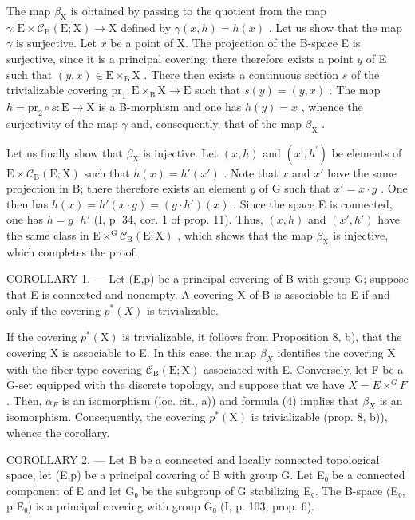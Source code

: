 The map \(\beta_{\mathrm{X}}\) is obtained by passing to the quotient from the map \(\gamma\colon\mathrm{E}\times\mathcal{C}_{\mathrm{B}}(\mathrm{E};\mathrm{X})\to\mathrm{X}\) defined by \(\gamma(x,h)=h(x)\) . Let us show that the map \(\gamma\) is surjective. Let \(x\) be a point of X. The projection of the B-space E is surjective, since it is a principal covering; there therefore exists a point \(y\) of E such that \((y,x)\in\mathrm{E}\times_{\mathrm{B}}\mathrm{X}\) . There then exists a continuous section \(s\) of the trivializable covering \(\mathrm{pr}_{1}:\mathrm{E}\times_{\mathrm{B}}\mathrm{X}\to\mathrm{E}\) such that \(s(y)=(y,x)\) . The map \(h=\mathrm{pr}_{2}\circ s:\mathrm{E}\to\mathrm{X}\) is a B-morphism and one has \(h(y)=x\) , whence the surjectivity of the map \(\gamma\) and, consequently, that of the map \(\beta_{\mathrm{X}}\) .

Let us finally show that \(\beta_{\mathrm{X}}\) is injective. Let \((x,h)\) and \((x^{\prime},h^{\prime})\) be elements of \(\mathrm{E}\times \mathcal{C}_{\mathrm{B}}(\mathrm{E};\mathrm{X})\) such that \(h(x) = h'(x')\) . Note that \(x\) and \(x'\) have the same projection in B; there therefore exists an element \(g\) of G such that \(x' = x\cdot g\) . One then has \(h(x) = h'(x\cdot g) = (g\cdot h')(x)\) . Since the space E is connected, one has \(h = g\cdot h'\) (I, p. 34, cor. 1 of prop. 11). Thus, \((x,h)\) and \((x',h')\) have the same class in \(\mathrm{E}\times^{\mathrm{G}}\mathcal{C}_{\mathrm{B}}(\mathrm{E};\mathrm{X})\) , which shows that the map \(\beta_{\mathrm{X}}\) is injective, which completes the proof.

COROLLARY 1. --- Let (E,p) be a principal covering of B with group G; suppose that E is connected and nonempty. A covering X of B is associable to E if and only if the covering \(p^{*}(X)\) is trivializable.

If the covering \(p^{*}(\mathrm{X})\) is trivializable, it follows from Proposition 8, b), that the covering X is associable to E. In this case, the map \(\beta_{X}\) identifies the covering X with the fiber-type covering \(\mathcal{C}_{\mathrm{B}}(\mathrm{E};\mathrm{X})\) associated with E. Conversely, let F be a G-set equipped with the discrete topology, and suppose that we have \(X = E \times^{G} F\) . Then, \(\alpha_{F}\) is an isomorphism (loc. cit., a)) and formula (4) implies that \(\beta_{X}\) is an isomorphism. Consequently, the covering \(p^{*}(\mathrm{X})\) is trivializable (prop. 8, b)), whence the corollary.

COROLLARY 2. --- Let B be a connected and locally connected topological space, let (E,p) be a principal covering of B with group G. Let E₀ be a connected component of E and let G₀ be the subgroup of G stabilizing E₀. The B-space (E₀, p \textbar{} E₀) is a principal covering with group G₀ (I, p. 103, prop. 6).

